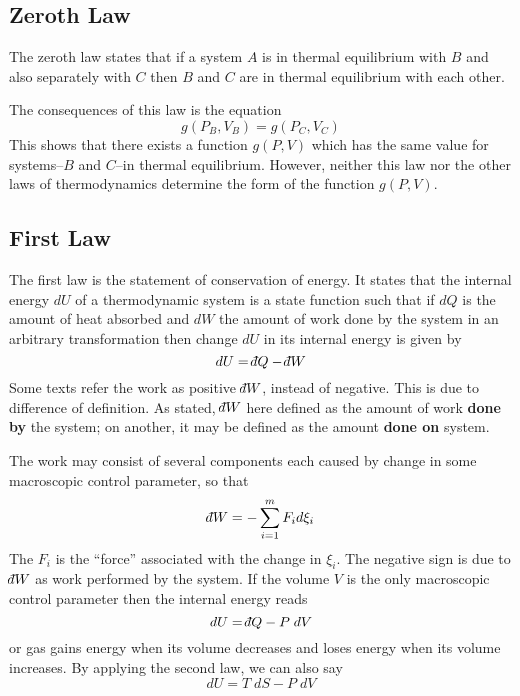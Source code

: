 \documentclass[../../../Main.tex]{subfiles}
\begin{document}
\subsection*{Zeroth Law}
The zeroth law states that if a system $A$ is in thermal equilibrium with $B$ and also separately with $C$ then $B$ and $C$ are in thermal equilibrium with each other. 

The consequences of this law is the equation
\begin{equation*}
    g(P_B , V_B ) = g(P_C , V_C )
\end{equation*}
This shows that there exists a function $g(P, V )$ which has the same value for systems--$B$ and $C$--in thermal equilibrium. However, neither this law nor the other laws of thermodynamics determine the form of the function $g(P, V )$.

\subsection*{First Law}
The first law is the statement of conservation of energy. It states that the internal energy $dU$ of a thermodynamic system is a state function such that if $d Q$ is the amount of heat absorbed and $d W $ the amount of work done by the system in an arbitrary transformation then change $d U$ in its internal energy is given by
\begin{equation*}
    d U=\dbar Q- \dbar W
\end{equation*}
Some texts refer the work as positive $\dbar W$, instead of negative. This is due to difference of definition. As stated, $\dbar W$ here defined as the amount of work \textbf{done by} the system; on another, it may be defined as the amount \textbf{done on} system.

The work may consist of several components each caused by change in some macroscopic control parameter, so that
\begin{equation*}
    \dbar W=-\sum_{i=1}^{m}F_id\xi_i
\end{equation*}
The $F_i$ is the “force” associated with the change in $\xi_i$. The negative sign is due to $\dbar W$ as work performed by the system. If the volume $V$ is the only macroscopic control parameter then the internal energy reads
\begin{equation*}
    dU=\dbar Q-P\;dV
\end{equation*}
or gas gains energy when its volume decreases and loses energy when its volume increases. By applying the second law, we can also say 
\begin{equation*}
    dU=T\;dS-P\;dV
\end{equation*}
\end{document}
